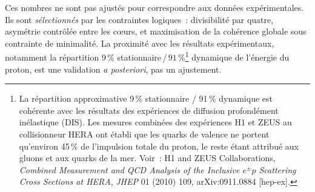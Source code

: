 \documentclass[12pt, a4paper, openright]{book}
\begin{document}
Ces nombres ne sont pas ajustés pour correspondre aux données expérimentales. Ils sont \emph{sélectionnés} par les contraintes logiques~: divisibilité par quatre, asymétrie contrôlée entre les c\oe{}urs, et maximisation de la cohérence globale sous contrainte de minimalité. La proximité avec les résultats expérimentaux, notamment la répartition $9\,\%$ stationnaire\,/\,$91\,\%$\footnote{La répartition approximative 9\,\% stationnaire / 91\,\% dynamique est cohérente avec les résultats des expériences de diffusion profondément inélastique (DIS). Les mesures combinées des expériences H1 et ZEUS au collisionneur HERA ont établi que les quarks de valence ne portent qu'environ 45\,\% de l'impulsion totale du proton, le reste étant attribué aux gluons et aux quarks de la mer. Voir~: H1 and ZEUS Collaborations, \textit{Combined Measurement and QCD Analysis of the Inclusive $e^{\pm}p$ Scattering Cross Sections at HERA}, \textit{JHEP} 01 (2010) 109, arXiv:0911.0884 [hep-ex].} dynamique de l'énergie du proton, est une validation \emph{a posteriori}, pas un ajustement.

\medskip
\end{document}
